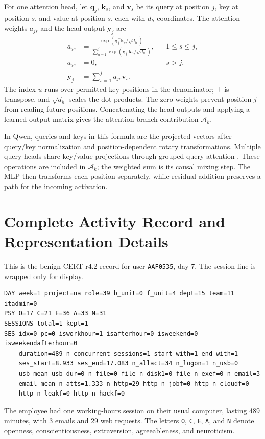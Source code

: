 \documentclass[12pt]{report}
\begin{document}
For one attention head, let $\mathbf q_j$, $\mathbf k_s$, and
$\mathbf v_s$ be its query at position $j$, key at position $s$,
and value at position $s$, each with $d_h$ coordinates.
The attention weights $a_{js}$ and the head output $\mathbf y_j$ are
\begin{equation}
\begin{aligned}
a_{js}
 &=\frac{\exp(\mathbf q_j^\top\mathbf k_s/\sqrt{d_h})}
         {\sum_{u=1}^{j}\exp(\mathbf q_j^\top\mathbf k_u/\sqrt{d_h})},
      &&1\leq s\leq j,\\
a_{js}&=0, &&s>j,\\
\mathbf y_j&=\sum_{s=1}^{j}a_{js}\mathbf v_s.
\end{aligned}
\label{eq:lm-attention}
\end{equation}
The index $u$ runs over permitted key positions in the denominator;
$\top$ is transpose, and $\sqrt{d_h}$ scales the dot products.
The zero weights prevent position $j$ from reading future positions.
Concatenating the head outputs and applying a learned output matrix
gives the attention branch contribution $\mathcal A_k$.

In Qwen, queries and keys in this formula are the projected vectors
after query/key normalization and position-dependent rotary transformations.
Multiple query heads share key/value projections through grouped-query
attention \cite{qwen3}. These operations are included in
$\mathcal A_k$; the weighted sum is its causal mixing step.
The MLP then transforms each position separately, while residual
addition preserves a path for the incoming activation.

\section{Complete Activity Record and Representation Details}
\label{sec:lm-record-details}
This is the benign CERT r4.2 record for user \texttt{AAF0535},
day 7. The session line is wrapped only for display.
\par\medskip
\noindent\begin{minipage}{\linewidth}
\small
\begin{verbatim}
DAY week=1 project=na role=39 b_unit=0 f_unit=4 dept=15 team=11 itadmin=0
PSY O=17 C=21 E=36 A=33 N=31
SESSIONS total=1 kept=1
SES idx=0 pc=0 isworkhour=1 isafterhour=0 isweekend=0 isweekendafterhour=0
    duration=489 n_concurrent_sessions=1 start_with=1 end_with=1
    ses_start=8.933 ses_end=17.083 n_allact=34 n_logon=1 n_usb=0
    usb_mean_usb_dur=0 n_file=0 file_n-disk1=0 file_n_exef=0 n_email=3
    email_mean_n_atts=1.333 n_http=29 http_n_jobf=0 http_n_cloudf=0
    http_n_leakf=0 http_n_hackf=0
\end{verbatim}
\end{minipage}
\par\medskip
The employee had one working-hours session on their usual computer,
lasting 489 minutes, with 3 emails and 29 web requests.
The letters \texttt{O}, \texttt{C}, \texttt{E}, \texttt{A}, and
\texttt{N} denote openness, conscientiousness, extraversion,
agreeableness, and neuroticism.
\end{document}
